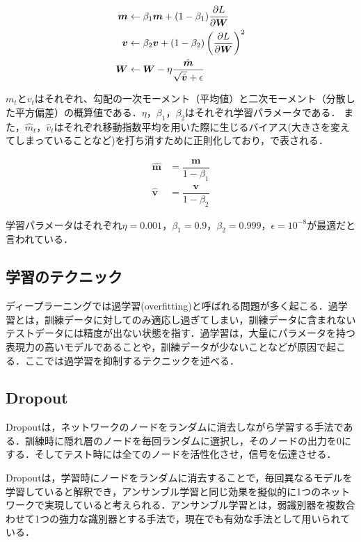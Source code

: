 \begin{align}\label{eq:adam}
	\bm{m} & \leftarrow \beta_1 \bm{m} + (1 - \beta_1) \dfrac{\partial L}{\partial \bm{W}} \\
	\bm{v} & \leftarrow \beta_2 \bm{v} + (1 - \beta_2) \left( \dfrac{\partial L}{\partial \bm{W}} \right) ^2 \\
	\bm{W} & \leftarrow \bm{W} - \eta \dfrac{\hat{\bm{m}}}{\sqrt{\hat{\bm{v}}} + \epsilon} 
\end{align}

$m_t$と$v_t$はそれぞれ、勾配の一次モーメント（平均値）と二次モーメント（分散した平方偏差）の概算値である．$\eta$，$\beta_1$，$\beta_2$はそれぞれ学習パラメータである．
また，$\hat{m}_t$，$\hat{v}_t$はそれぞれ移動指数平均を用いた際に生じるバイアス(大きさを変えてしまっていることなど)を打ち消すために正則化しており，で表される．

\begin{align}\label{eq:adamhat}
	\hat{\bm{m}} & = \dfrac{\bm{m}}{1 - \beta_1} \\
	\hat{\bm{v}} & = \dfrac{\bm{v}}{1 - \beta_2}
\end{align}

学習パラメータはそれぞれ$\eta = 0.001$，$\beta_1 = 0.9$，$\beta_2 = 0.999$，$\epsilon = 10^{-8}$が最適だと言われている\cite{Adam}．

\subsection{学習のテクニック}
ディープラーニングでは過学習(overfitting)と呼ばれる問題が多く起こる．過学習とは，訓練データに対してのみ適応し過ぎてしまい，訓練データに含まれないテストデータには精度が出ない状態を指す．過学習は，大量にパラメータを持つ表現力の高いモデルであることや，訓練データが少ないことなどが原因で起こる．ここでは過学習を抑制するテクニックを述べる．

\subsection*{Dropout}
Dropout\cite{Dropout}は，ネットワークのノードをランダムに消去しながら学習する手法である．訓練時に隠れ層のノードを毎回ランダムに選択し，そのノードの出力を0にする．そしてテスト時には全てのノードを活性化させ，信号を伝達させる．

Dropoutは，学習時にノードをランダムに消去することで，毎回異なるモデルを学習していると解釈でき，アンサンブル学習と同じ効果を擬似的に1つのネットワークで実現していると考えられる．アンサンブル学習とは，弱識別器を複数合わせて1つの強力な識別器とする手法で，現在でも有効な手法として用いられている．

